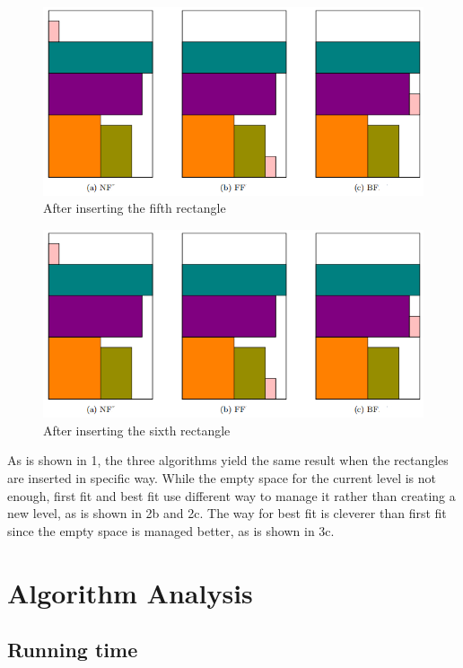 \documentclass[12pt]{article}
\begin{document}
    \begin{figure}[h]
        \centering
        \includegraphics[scale=0.5]{2.png}
        \caption{After inserting the fifth rectangle}
    \end{figure}

    \begin{figure}[h]
        \centering
        \includegraphics[scale=0.5]{2.png}
        \caption{After inserting the sixth rectangle}
    \end{figure}

    As is shown in 1, the three algorithms yield the same result when the rectangles are inserted 
    in specific way. While the empty space for the current level is not enough, first fit and best fit use 
    different way to manage it rather than creating a new level, as is shown in 2b and 2c. The way 
    for best fit is cleverer than first fit since the empty space is managed better, as is shown in 3c.

    \section{Algorithm Analysis}
    \subsection{Running time}
\end{document}
